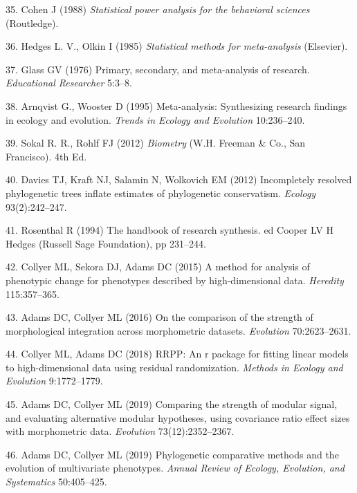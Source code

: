 \documentclass[9pt,twocolumn,twoside,lineno]{pnas-new}
\begin{document}
\leavevmode\hypertarget{ref-Cohen1988}{}%
35. Cohen J (1988) \emph{Statistical power analysis for the behavioral
sciences} (Routledge).

\leavevmode\hypertarget{ref-HedgesOlkin1985}{}%
36. Hedges L. V., Olkin I (1985) \emph{Statistical methods for
meta-analysis} (Elsevier).

\leavevmode\hypertarget{ref-Glass1976}{}%
37. Glass GV (1976) Primary, secondary, and meta-analysis of research.
\emph{Educational Researcher} 5:3--8.

\leavevmode\hypertarget{ref-Arnqvist1995}{}%
38. Arnqvist G., Wooster D (1995) Meta-analysis: Synthesizing research
findings in ecology and evolution. \emph{Trends in Ecology and
Evolution} 10:236--240.

\leavevmode\hypertarget{ref-SokalRohlf2012}{}%
39. Sokal R. R., Rohlf FJ (2012) \emph{Biometry} (W.H. Freeman \& Co.,
San Francisco). 4th Ed.

\leavevmode\hypertarget{ref-Davies2012}{}%
40. Davies TJ, Kraft NJ, Salamin N, Wolkovich EM (2012) Incompletely
resolved phylogenetic trees inflate estimates of phylogenetic
conservatism. \emph{Ecology} 93(2):242--247.

\leavevmode\hypertarget{ref-Rosenthal1994}{}%
41. Rosenthal R (1994) The handbook of research synthesis. ed Cooper LV
H Hedges (Russell Sage Foundation), pp 231--244.

\leavevmode\hypertarget{ref-Collyer_et_al2015a}{}%
42. Collyer ML, Sekora DJ, Adams DC (2015) A method for analysis of
phenotypic change for phenotypes described by high-dimensional data.
\emph{Heredity} 115:357--365.

\leavevmode\hypertarget{ref-AdamsCollyer2016}{}%
43. Adams DC, Collyer ML (2016) On the comparison of the strength of
morphological integration across morphometric datasets. \emph{Evolution}
70:2623--2631.

\leavevmode\hypertarget{ref-CollyerAdams2018}{}%
44. Collyer ML, Adams DC (2018) RRPP: An r package for fitting linear
models to high-dimensional data using residual randomization.
\emph{Methods in Ecology and Evolution} 9:1772--1779.

\leavevmode\hypertarget{ref-AdamsCollyer2019b}{}%
45. Adams DC, Collyer ML (2019) Comparing the strength of modular
signal, and evaluating alternative modular hypotheses, using covariance
ratio effect sizes with morphometric data. \emph{Evolution}
73(12):2352--2367.

\leavevmode\hypertarget{ref-AdamsCollyer2019}{}%
46. Adams DC, Collyer ML (2019) Phylogenetic comparative methods and the
evolution of multivariate phenotypes. \emph{Annual Review of Ecology,
Evolution, and Systematics} 50:405--425.
\end{document}

